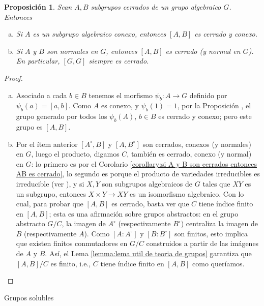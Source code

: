 \documentclass[spanish,10pt]{amsart}
\makeatletter
\renewcommand\subsection{\@startsection{subsection}{2}%
  \z@{.5\linespacing\@plus.7\linespacing}{-.5em}%
  {\normalfont\sffamily}}
\newtheorem{proposition}[theorem]{Proposición}
\theoremstyle{definition}
\theoremstyle{remark}
\numberwithin{equation}{section}
\makeatother
\begin{document}
\begin{proposition}\label{proposition: el conmutador de conexo es conexo}
Sean $A,B$ subgrupos cerrados de un grupo algebraico $G$. Entonces
\begin{enumerate}[(a)]
\item Si $A$ es un subgrupo algebraico conexo, entonces $[A,B]$ es cerrado y conexo.
\item Si $A$ y $B$ son normales en $G$, entonces $[A,B]$ es cerrado (y normal en $G$). En particular, $[G,G]$ siempre es cerrado.
\end{enumerate}
\end{proposition}
\begin{proof}
\begin{enumerate}[(a)]
\item Asociado a cada $b \in B$ tenemos el morfismo $\psi_b : A \to G$ definido por $\psi_b (a) = [a,b]$. Como $A$ es conexo, y $\psi_b (1) = 1$, por la Proposición \cite[7.5]{humphreys2012linearAlgebraicGroups}, el grupo generado por todos los $\psi_b (A)$, $b \in B$ es cerrado y conexo; pero este grupo es $[A,B]$.
\item Por el ítem anterior $[A^\circ, B]$ y $[A, B^\circ]$ son cerrados, conexos (y normales) en $G$, luego el producto, digamos $C$, también es cerrado, conexo (y normal) en $G$: lo primero es por el Corolario \ref{corollary:si A y B son cerrados entonces AB es cerrado}, lo segundo es porque el producto de variedades irreducibles es irreducible (ver \cite[Proposición 2.8.5]{notas_pedro}), y si $X,Y$ son subgrupos algebraicos de $G$ tales que $XY$ es un subgrupo, entonces $X \times Y \to XY$ es un isomorfismo algebraico. Con lo cual, para probar que $[A,B]$ es cerrado, basta ver que $C$ tiene índice finito en $[A,B]$; esta es una afirmación sobre grupos abstractos: en el grupo abstracto $G/C$, la imagen de $A^\circ$ (respectivamente $B^\circ$) centraliza la imagen de $B$ (respectivamente $A$). Como $[A : A^\circ]$ y $[B: B^\circ]$ son finitos, esto implica que existen finitos conmutadores en $G/C$ construidos a partir de las imágenes de $A$ y $B$. Así, el Lema \ref{lemma:lema util de teoria de grupos} garantiza que $[A,B]/C$ es finito, i.e., $C$ tiene índice finito en $[A,B]$ como queríamos.
\end{enumerate}
\end{proof}


\subsection{Grupos solubles}
\end{document}

